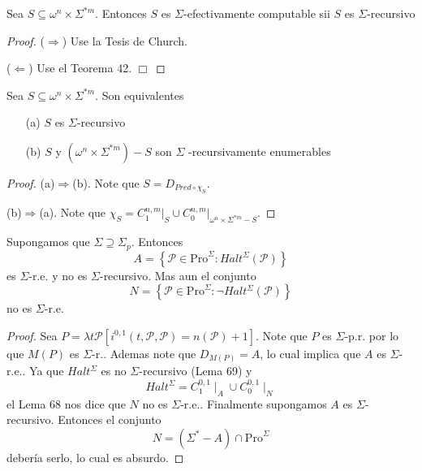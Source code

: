   \begin{theorem}
     Sea \(S\subseteq \omega ^{n}\times \Sigma ^{\ast m}\). Entonces \(S\) es \(\Sigma \)-efectivamente computable sii
     \(S\) es \(\Sigma \)-recursivo
  \begin{proof}
    (\(\Rightarrow \)) Use la Tesis de Church.

    (\(\Leftarrow \)) Use el Teorema 42. \(\Box\)
  \end{proof}
  \end{theorem}

  \begin{theorem} Sea \(S\subseteq \omega ^{n}\times \Sigma ^{\ast m}.\) Son equivalentes
    \begin{itemize}
      \item[(a)] \(S\) es \(\Sigma \)-recursivo
      \item[(b)] \(S\) y \((\omega ^{n}\times \Sigma ^{\ast m})-S\) son \(\Sigma \) -recursivamente enumerables
    \end{itemize}
  \begin{proof}
    (a)\(\Rightarrow \)(b)\(.\) Note que \(S=D_{Pred\circ \chi _{S}}.\)

    (b)\(\Rightarrow \)(a). Note que \(\chi _{S}=C_{1}^{n,m}\mathrm{\mid }_{S}\cup C_{0}^{n,m}\mathrm{\mid }_{\omega 
    ^{n}\times \Sigma ^{\ast m}-S}\).
  \end{proof}
  \end{theorem}

  \begin{lemma} Supongamos que \(\Sigma \supseteq \Sigma _{p}.\) Entonces
    \[
      \displaystyle A=\left\{ \mathcal{P}\in \mathrm{Pro}^{\Sigma }:Halt^{\Sigma }(\mathcal{P} )\right\}
    \]
    es \(\Sigma \)-r.e. y no es \(\Sigma \)-recursivo. Mas aun el conjunto
    \[
      \displaystyle N=\left\{ \mathcal{P}\in \mathrm{Pro}^{\Sigma }:\lnot Halt^{\Sigma }( \mathcal{P})\right\}
    \]
    no es \(\Sigma \)-r.e.
  \begin{proof}
    Sea \(P=\lambda t\mathcal{P}\left[ i^{0,1}(t,\mathcal{P},\mathcal{P})=n( \mathcal{P})+1\right] \).
    Note que \(P\) es \(\Sigma \)-p.r. por lo que \(M(P)\) es \(\Sigma \)-r.. Ademas note que \(D_{M(P)}=A\),
    lo cual implica que \(A\) es \( \Sigma \)-r.e.. Ya que \(Halt^{\Sigma }\) es no \(\Sigma \)-recursivo (Lema 69) y
    \[
      \displaystyle Halt^{\Sigma }=C_{1}^{0,1}\mid _{A}\cup C_{0}^{0,1}\mid _{N}
    \]
    el Lema 68 nos dice que \(N\) no es \(\Sigma \)-r.e.. Finalmente supongamos \(A\) es \(\Sigma \)-recursivo. Entonces el conjunto
    \[
      \displaystyle N=\left( \Sigma ^{\ast }-A\right) \cap \mathrm{Pro}^{\Sigma }
    \]
    debería serlo, lo cual es absurdo.
  \end{proof}
  \end{lemma}
